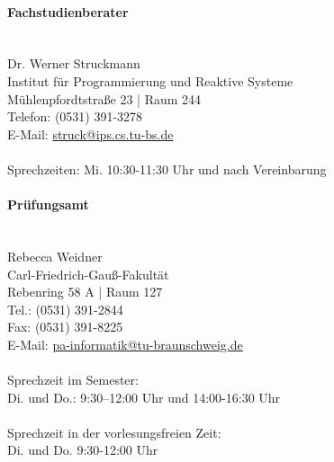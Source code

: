 \paragraph{\small{Fachstudienberater}} \ \\
Dr. Werner Struckmann\\
Institut für Programmierung und Reaktive Systeme\\
Mühlenpfordtstraße 23 | Raum 244\\
Telefon: (0531) 391-3278\\
E-Mail: \url{struck@ips.cs.tu-bs.de}\\
\\
Sprechzeiten: Mi. 10:30-11:30 Uhr und nach  Vereinbarung

\paragraph{\small{Prüfungsamt}} \ \\
Rebecca Weidner\\
Carl-Friedrich-Gauß-Fakultät\\
Rebenring 58 A | Raum 127\\
Tel.: (0531) 391-2844\\
Fax: (0531) 391-8225\\
E-Mail: \url{pa-informatik@tu-braunschweig.de}\\
\\
Sprechzeit im Semester:\\
Di. und Do.:
9:30–12:00 Uhr und 14:00-16:30 Uhr\\
\\
Sprechzeit in der vorlesungsfreien Zeit:\\
Di. und Do.
9:30-12:00 Uhr \\


